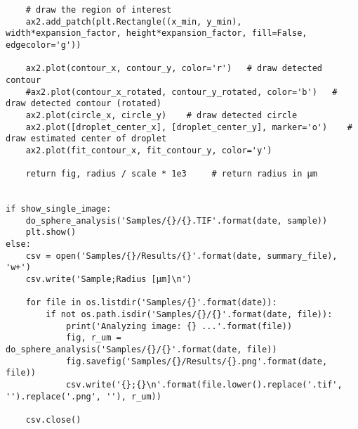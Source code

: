 \begin{lstlisting}
    # draw the region of interest
    ax2.add_patch(plt.Rectangle((x_min, y_min), width*expansion_factor, height*expansion_factor, fill=False, edgecolor='g'))

    ax2.plot(contour_x, contour_y, color='r')   # draw detected contour
    #ax2.plot(contour_x_rotated, contour_y_rotated, color='b')   # draw detected contour (rotated)
    ax2.plot(circle_x, circle_y)    # draw detected circle
    ax2.plot([droplet_center_x], [droplet_center_y], marker='o')    # draw estimated center of droplet
    ax2.plot(fit_contour_x, fit_contour_y, color='y')

    return fig, radius / scale * 1e3     # return radius in µm


if show_single_image:
    do_sphere_analysis('Samples/{}/{}.TIF'.format(date, sample))
    plt.show()
else:
    csv = open('Samples/{}/Results/{}'.format(date, summary_file), 'w+')
    csv.write('Sample;Radius [µm]\n')

    for file in os.listdir('Samples/{}'.format(date)):
        if not os.path.isdir('Samples/{}/{}'.format(date, file)):
            print('Analyzing image: {} ...'.format(file))
            fig, r_um = do_sphere_analysis('Samples/{}/{}'.format(date, file))
            fig.savefig('Samples/{}/Results/{}.png'.format(date, file))
            csv.write('{};{}\n'.format(file.lower().replace('.tif', '').replace('.png', ''), r_um))

    csv.close()
\end{lstlisting}